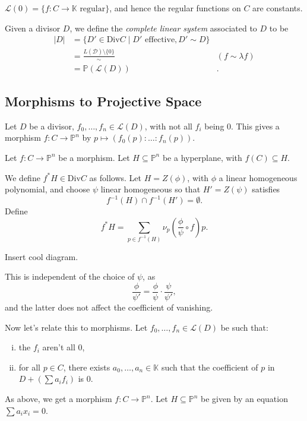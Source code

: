 \documentclass[12pt]{article}
\begin{document}
\begin{remark}
	$\mathcal{L}(0) = \{f : C \to \mathbb{K} \text{ regular}\}$, and hence the regular functions on $C$ are constants.
\end{remark}

\begin{definition}
	Given a divisor $D$, we define the \emph{complete linear system} associated to $D$ to be
	\begin{align*}
		|D| &= \{D' \in \mathrm{Div} C \mid D' \text{ effective}, D' \sim D\} &\\
		    &= \frac{L(\mathcal{D}) \setminus \{0\}}{\sim} &(f \sim \lambda f)\\
		    &= \mathbb{P}(\mathcal{L}(D)) &.
	\end{align*}
\end{definition}

\subsection{Morphisms to Projective Space}%
\label{sub:morph_proj}

Let $D$ be a divisor, $f_0, \ldots, f_n \in \mathcal{L}(D)$, with not all $f_i$ being 0. This gives a morphism $f : C \to \mathbb{P}^n$ by $p \mapsto (f_0(p): \ldots : f_n(p))$.

\begin{definition}
	Let $f : C \to \mathbb{P}^n$ be a morphism. Let $H \subseteq \mathbb{P}^n$ be a hyperplane, with $f(C) \subseteq H$.

	We define $f^\ast H \in \mathrm{Div} C$ as follows. Let $H = Z(\phi)$, with $\phi$ a linear homogeneous polynomial, and choose $\psi$ linear homogeneous so that $H' = Z(\psi)$ satisfies
	\[
	f^{-1}(H) \cap f^{-1}(H') = \emptyset.
	\]
	Define
	\[
	f^\ast H = \sum_{p \in f^{-1}(H)} \nu_p\left( \frac{\phi}{\psi} \circ f \right) p.
	\]
\end{definition}

Insert cool diagram.

\begin{remark}
	This is independent of the choice of $\psi$, as
	\[
	\frac{\phi}{\psi'} = \frac{\phi}{\psi} \cdot \frac{\psi}{\psi'},
	\]
	and the latter does not affect the coefficient of vanishing.
\end{remark}

Now let's relate this to morphisms. Let $f_0, \ldots, f_n \in \mathcal{L}(D)$ be such that:
\begin{enumerate}[(i)]
	\item the $f_i$ aren't all $0$,
	\item for all $p \in C$, there exists $a_0, \ldots, a_n \in \mathbb{K}$ such that the coefficient of $p$ in $D + (\sum a_i f_i)$ is 0.
\end{enumerate}
As above, we get a morphism $f : C \to \mathbb{P}^n$. Let $H \subseteq \mathbb{P}^n$ be given by an equation $\sum a_i x_i = 0$.
\end{document}
